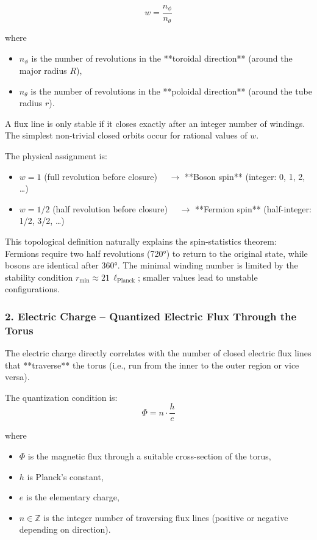 \documentclass[12pt,a4paper]{article}
\begin{document}
\begin{equation}
	w = \frac{n_\phi}{n_\theta}
	\label{eq:winding_number}
\end{equation}

where
\begin{itemize}
	\item $n_\phi$ is the number of revolutions in the **toroidal direction** (around the major radius $R$),
	\item $n_\theta$ is the number of revolutions in the **poloidal direction** (around the tube radius $r$).
\end{itemize}

A flux line is only stable if it closes exactly after an integer number of windings. The simplest non-trivial closed orbits occur for rational values of $w$.

The physical assignment is:
\begin{itemize}
	\item $w = 1$ \quad (full revolution before closure) $\quad \to$ **Boson spin** (integer: 0, 1, 2, …)
	\item $w = 1/2$ \quad (half revolution before closure) $\quad \to$ **Fermion spin** (half-integer: 1/2, 3/2, …)
\end{itemize}

This topological definition naturally explains the spin-statistics theorem: Fermions require two half revolutions (720°) to return to the original state, while bosons are identical after 360°. The minimal winding number is limited by the stability condition $r_{\min} \approx 21 \, \ell_{\text{Planck}}$; smaller values lead to unstable configurations.

\subsubsection{2. Electric Charge – Quantized Electric Flux Through the Torus}

The electric charge directly correlates with the number of closed electric flux lines that **traverse** the torus (i.e., run from the inner to the outer region or vice versa).

The quantization condition is:
\begin{equation}
	\Phi = n \cdot \frac{h}{e}
	\label{eq:flux_quantization}
\end{equation}

where
\begin{itemize}
	\item $\Phi$ is the magnetic flux through a suitable cross-section of the torus,
	\item $h$ is Planck's constant,
	\item $e$ is the elementary charge,
	\item $n \in \mathbb{Z}$ is the integer number of traversing flux lines (positive or negative depending on direction).
\end{itemize}
\end{document}
